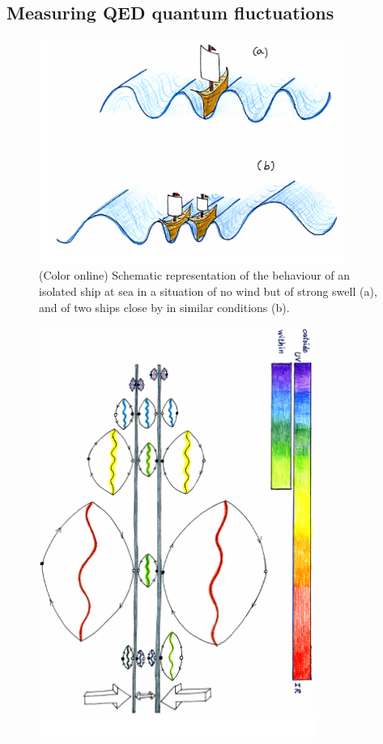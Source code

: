 \begin{subappendices}
\subsection{Measuring QED quantum fluctuations}
\begin{figure}
\centerline{\includegraphics[width=10cm]{C8/figsC8/fig6G2.pdf}}
\caption{(Color online) Schematic representation of the behaviour of an isolated ship at sea in a situation of no wind but of
strong swell (a), and of two ships close by in similar conditions (b).}\label{fig6G2}
\end{figure}
\begin{figure}
\centerline{\includegraphics[width=9cm]{C8/figsC8/fig6G3.pdf}}

\end{figure}
\end{subappendices}
